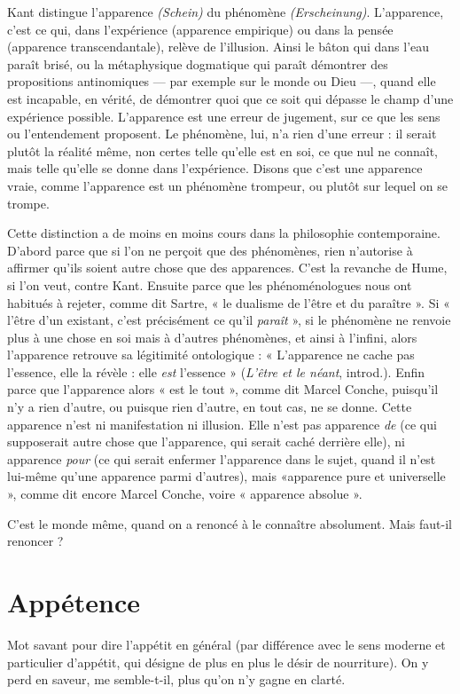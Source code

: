 Kant distingue l'apparence {\it (Schein)} du phénomène {\it (Erscheinung)}. L’apparence,
c'est ce qui, dans l’expérience (apparence empirique) ou dans la pensée
(apparence transcendantale), relève de l'illusion. Ainsi le bâton qui dans l’eau
paraît brisé, ou la métaphysique dogmatique qui paraît démontrer des propositions
antinomiques — par exemple sur le monde ou Dieu —, quand elle est incapable,
en vérité, de démontrer quoi que ce soit qui dépasse le champ d’une
expérience possible. L’apparence est une erreur de jugement, sur ce que les sens
ou l’entendement proposent. Le phénomène, lui, n’a rien d’une erreur : il serait
plutôt la réalité même, non certes telle qu’elle est en soi, ce que nul ne connaît,
mais telle qu’elle se donne dans l’expérience. Disons que c’est une apparence
vraie, comme l’apparence est un phénomène trompeur, ou plutôt sur lequel on
se trompe.

Cette distinction a de moins en moins cours dans la philosophie contemporaine.
D'abord parce que si l’on ne perçoit que des phénomènes, rien n’autorise
à affirmer qu’ils soient autre chose que des apparences. C’est la revanche de
Hume, si l’on veut, contre Kant. Ensuite parce que les phénoménologues nous
ont habitués à rejeter, comme dit Sartre, « le dualisme de l'être et du paraître ».
Si « l'être d’un existant, c’est précisément ce qu’il {\it paraît} », si le phénomène ne
renvoie plus à une chose en soi mais à d’autres phénomènes, et ainsi à l'infini,
alors l'apparence retrouve sa légitimité ontologique : « L’apparence ne cache
pas l'essence, elle la révèle : elle {\it est} l'essence » ({\it L'être et le néant}, introd.). Enfin
parce que l’apparence alors « est le tout », comme dit Marcel Conche, puisqu'il
n'y a rien d’autre, ou puisque rien d’autre, en tout cas, ne se donne. Cette
apparence n'est ni manifestation ni illusion. Elle n’est pas apparence {\it de} (ce qui
supposerait autre chose que l’apparence, qui serait caché derrière elle), ni apparence
{\it pour} (ce qui serait enfermer l'apparence dans le sujet, quand il n’est lui-même
qu'une apparence parmi d’autres), mais «apparence pure et
universelle », comme dit encore Marcel Conche, voire « apparence absolue ».

C’est le monde même, quand on a renoncé à le connaître absolument. Mais
faut-il renoncer ?

\section{Appétence}
Mot savant pour dire l’appétit en général (par différence avec
le sens moderne et particulier d’appétit, qui désigne de plus
en plus le désir de nourriture). On y perd en saveur, me semble-t-il, plus qu’on
n’y gagne en clarté.

